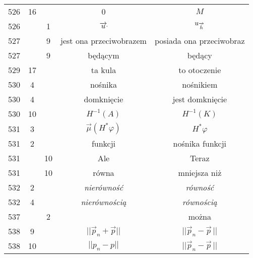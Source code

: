 \documentclass[a4paper,11pt]{article}
\begin{document}
\begin{center}
\begin{tabular}{|c|c|c|c|c|}
    526 & 16 & & 0 & $M$ \\
    526 & &  1 & $\overrightarrow{ u }_{ \dot{ } }$
           & $u_{ \overrightarrow{ \dot{ h } } }$ \\
    527 & &  9 & jest ona przeciwobrazem & posiada ona przeciwobraz \\
    527 & &  9 & będącym & będący \\
    529 & 17 & & ta kula & to otoczenie \\
    530 &  4 & & nośnika & nośnikiem \\
    530 &  4 & & domknięcie & jest domknięcie \\
    530 & 10 & & $H^{ -1 }( A )$ & $H^{ -1 }( K )$ \\
    531 &  3 & & $\vec{ \mu }( H^{ * } \varphi )$ & $H^{ * } \varphi$ \\
    531 &  2 & & funkcji & nośnika funkcji \\
    531 & & 10 & Ale & Teraz \\
    531 & & 10 & równa & mniejsza niż \\
    532 &  2 & & \emph{nierówność} & \emph{równość} \\
    532 &  4 & & \emph{nierównością} & \emph{równością} \\
    537 & &  2 & & można \\
    538 &  9 & & $|| \vec{ p }_{ n } + \vec{ p } ||$
           & $|| \vec{ p }_{ n } - \vec{ p }\, ||$ \\
    538 & 10 & & $|| p_{ n } - p ||$ & $|| \vec{ p }_{ n }
                                       - \vec{ p }\, ||$  \\ \hline
  \end{tabular}


\end{center}
\end{document}
